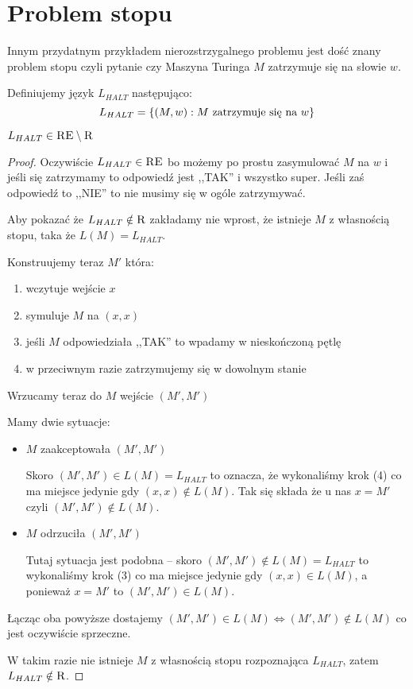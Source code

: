 \section{Problem stopu}

Innym przydatnym przykładem nierozstrzygalnego problemu jest dość znany problem stopu czyli pytanie czy Maszyna Turinga \( M \) zatrzymuje się na słowie \( w \).

\begin{definition}
    Definiujemy język \( L_{HALT} \) następująco:
    \[
        L_{HALT} = \set{(M, w) : M \text{ zatrzymuje się na } w}
    \]
\end{definition}

\begin{theorem}
    \( L_{HALT} \in \textsc{RE} \setminus \textsc{R} \)
\end{theorem}
\begin{proof}
    Oczywiście \( L_{HALT} \in \textsc{RE} \) bo możemy po prostu zasymulować \( M \) na \( w \) i jeśli się zatrzymamy to odpowiedź jest ,,TAK'' i wszystko super. Jeśli zaś odpowiedź to ,,NIE'' to nie musimy się w ogóle zatrzymywać.
    
    Aby pokazać że \( L_{HALT} \notin \textsc{R} \) zakładamy nie wprost, że istnieje \( M \) z własnością stopu, taka że \( L(M) = L_{HALT} \).
    
    Konstruujemy teraz \( M' \) która:
    \begin{enumerate}
        \item wczytuje wejście \( x \)
        \item symuluje \( M \) na \( (x, x) \)
        \item jeśli \( M \) odpowiedziała ,,TAK'' to wpadamy w nieskończoną pętlę
        \item w przeciwnym razie zatrzymujemy się w dowolnym stanie
    \end{enumerate}
    
    Wrzucamy teraz do \( M \) wejście \( (M', M') \)
    
    Mamy dwie sytuacje:
    \begin{itemize}
        \item \( M \) zaakceptowała \( (M', M') \)
        
        Skoro \( (M', M') \in L(M) = L_{HALT} \) to oznacza, że
        wykonaliśmy krok (4) co ma miejsce jedynie gdy \( (x, x) \notin L(M) \). Tak się składa że u nas \( x = M' \) czyli \( (M', M') \notin L(M) \).
        
        \item \( M \) odrzuciła \( (M', M') \)
        
        Tutaj sytuacja jest podobna -- skoro \( (M', M') \notin L(M) = L_{HALT} \) to
        wykonaliśmy krok (3) co ma miejsce jedynie gdy \( (x, x) \in L(M) \), a ponieważ \( x = M' \) to \( (M', M') \in L(M) \).
    \end{itemize}
    
    Łącząc oba powyższe dostajemy \( (M', M') \in L(M) \iff (M', M') \notin L(M) \) co jest oczywiście sprzeczne. 
    
    W takim razie nie istnieje \( M \) z własnością stopu rozpoznająca \( L_{HALT} \), zatem \( L_{HALT} \notin \textsc{R} \).
\end{proof}